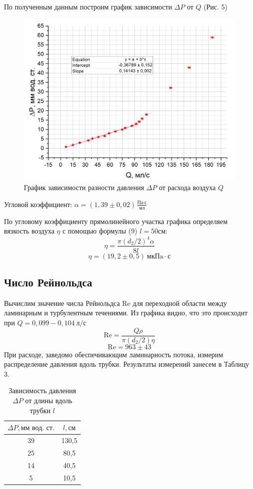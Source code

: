 \documentclass[a4paper,12pt]{article}
\theoremstyle{plain} %
\theoremstyle{definition} %
\theoremstyle{remark} %
\begin{document}
По полученным данным построим график зависимости $\Delta P$ от $Q$ (Рис. 5)
\begin{figure}[!h]
	\begin{center}
		\includegraphics[width=0.85\linewidth]{5}
	\end{center}
\caption{График зависимости разности давления $\Delta P$ от расхода воздуха $Q$}
\end{figure}

\noindent Угловой коэффициент: $\alpha = (1,39\pm0,02)\frac{\text{Па} \cdot \text{с}}{\text{мл}}$

По угловому коэффициенту прямолинейного участка графика определяем вязкость воздуха $\eta$ с помощью формулы (9) $l = 50\text{см}$:
\[\eta = \frac{\pi (d_2/2)^4 \alpha}{8 l}\]
\[\eta = (19,2\pm0,5)\ \text{мкПa}\cdot \text{с}\]
\subsection{Число Рейнольдса}
Вычислим значение числа Рейнольдса 	Re для переходной области между ламинарным и турбулентным течениями. Из графика видно, что это происходит при $Q = 0,099 -0,104 \  \text{л/с} $
\[\text{Re} = \frac{Q  \rho}{\pi (d_2/2)\eta}  \]
\[ \text{Re} = 963\pm43  \]
При расходе, заведомо обеспечивающим ламинарность потока, измерим распределение давления вдоль трубки. Результаты измерений занесем в Таблицу 3.
\begin{table}[h]
	\begin{center}
	\begin{tabular}{|c|c|}
		\hline
		$\Delta P, \text{мм вод. ст.}$  &  $l, \text{см}$ \\ \hline
		39       & 130,5 \\ \hline
		25       & 80,5  \\ \hline
		14       & 40,5  \\ \hline
		5        & 10,5  \\ \hline
	\end{tabular}
\caption{Зависимость давления $\Delta P$ от длины вдоль трубки $l$}
\end{center}

\end{table}
\end{document}
